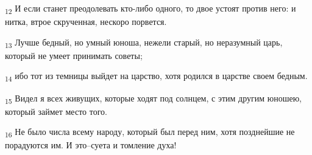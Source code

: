 \begin{tcolorbox}
\textsubscript{12} И если станет преодолевать кто-либо одного, то двое устоят против него: и нитка, втрое скрученная, нескоро порвется.
\end{tcolorbox}
\begin{tcolorbox}
\textsubscript{13} Лучше бедный, но умный юноша, нежели старый, но неразумный царь, который не умеет принимать советы;
\end{tcolorbox}
\begin{tcolorbox}
\textsubscript{14} ибо тот из темницы выйдет на царство, хотя родился в царстве своем бедным.
\end{tcolorbox}
\begin{tcolorbox}
\textsubscript{15} Видел я всех живущих, которые ходят под солнцем, с этим другим юношею, который займет место того.
\end{tcolorbox}
\begin{tcolorbox}
\textsubscript{16} Не было числа всему народу, который был перед ним, хотя позднейшие не порадуются им. И это--суета и томление духа!
\end{tcolorbox}
